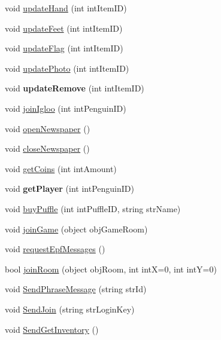 \begin{DoxyCompactItemize}
void \hyperlink{classSharpenguin_1_1Tasks_a1e2a3bcb87966bebde0202356174962c}{update\-Hand} (int int\-Item\-I\-D)
\item 
void \hyperlink{classSharpenguin_1_1Tasks_afcfff4673b77a152c39934505324e794}{update\-Feet} (int int\-Item\-I\-D)
\item 
void \hyperlink{classSharpenguin_1_1Tasks_a5dbd850a020d9d459eed99a8c45d8e75}{update\-Flag} (int int\-Item\-I\-D)
\item 
void \hyperlink{classSharpenguin_1_1Tasks_a28834ede17e7850508025bbed190a641}{update\-Photo} (int int\-Item\-I\-D)
\item 
\hypertarget{classSharpenguin_1_1Tasks_af9b7a0677366bfaeba38dcc5cb0d8bb5}{void {\bfseries update\-Remove} (int int\-Item\-I\-D)}\label{classSharpenguin_1_1Tasks_af9b7a0677366bfaeba38dcc5cb0d8bb5}

\item 
void \hyperlink{classSharpenguin_1_1Tasks_a29e019a91b08cb92c9fa7f3ba9f33776}{join\-Igloo} (int int\-Penguin\-I\-D)
\item 
void \hyperlink{classSharpenguin_1_1Tasks_aca9013fed2c6e6cf5e19771aae98531d}{open\-Newspaper} ()
\item 
void \hyperlink{classSharpenguin_1_1Tasks_afa6b3fb4e044dfaf6c9520b56d276dca}{close\-Newspaper} ()
\item 
void \hyperlink{classSharpenguin_1_1Tasks_ae4e482fa82fb3c02cae015f4ae9f527c}{get\-Coins} (int int\-Amount)
\item 
\hypertarget{classSharpenguin_1_1Tasks_a5518e385cb00ea50b63cf03035d31717}{void {\bfseries get\-Player} (int int\-Penguin\-I\-D)}\label{classSharpenguin_1_1Tasks_a5518e385cb00ea50b63cf03035d31717}

\item 
void \hyperlink{classSharpenguin_1_1Tasks_a2e667922c2df819ec504636ab8523f5a}{buy\-Puffle} (int int\-Puffle\-I\-D, string str\-Name)
\item 
void \hyperlink{classSharpenguin_1_1Tasks_af7ed0b413f925907983b7242441074c1}{join\-Game} (object obj\-Game\-Room)
\item 
void \hyperlink{classSharpenguin_1_1Tasks_ab6153b32f78f2a137bda915a3a35cecd}{request\-Epf\-Messages} ()
\item 
bool \hyperlink{classSharpenguin_1_1Tasks_ad71a7aec9611f9aaf9715a52bde33c04}{join\-Room} (object obj\-Room, int int\-X=0, int int\-Y=0)
\item 
void \hyperlink{classSharpenguin_1_1Tasks_a9ceb3ef96c8a645127c4353afbcc4560}{Send\-Phrase\-Message} (string str\-Id)
\item 
void \hyperlink{classSharpenguin_1_1Tasks_a5965355bcfb2fd527fa4436b34a1aeb7}{Send\-Join} (string str\-Login\-Key)
\item 
void \hyperlink{classSharpenguin_1_1Tasks_a2fd5289a96dc2a8466554e89fed6de97}{Send\-Get\-Inventory} ()
\end{DoxyCompactItemize}
